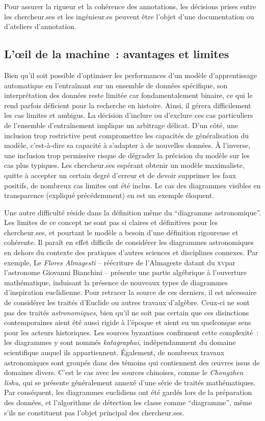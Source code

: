 Pour assurer la rigueur et la cohérence des annotations, les décisions
prises entre les chercheur.ses et les ingénieur.es peuvent être l'objet d'une
documentation ou d'ateliers d'annotation.

\hypertarget{loeil-de-la-machine-avantages-et-limites}{%
\subsection{L'œil de la machine~: avantages et
limites}\label{loeil-de-la-machine-avantages-et-limites}}

Bien qu'il soit possible d'optimiser les performances d'un modèle
d'apprentissage automatique en l'entraînant sur un ensemble de données
spécifique, son interprétation des données reste limitée car
fondamentalement binaire, ce qui le rend parfois déficient pour la
recherche en histoire. Ainsi, il gérera difficilement les cas limites et
ambigus. La décision d'inclure ou d'exclure ces cas particuliers de
l'ensemble d'entraînement implique un arbitrage délicat. D'un côté, une
inclusion trop restrictive peut compromettre les capacités de
généralisation du modèle, c'est-à-dire sa capacité à s'adapter à de
nouvelles données. À l'inverse, une inclusion trop permissive risque de
dégrader la précision du modèle sur les cas plus typiques. Les
chercheur.ses espérant obtenir un modèle maximaliste, quitte à accepter un
certain degré d'erreur et de devoir supprimer les faux
positifs, de nombreux cas limites ont été inclus. Le cas des diagrammes
visibles en transparence (expliqué précédemment) en est un exemple
éloquent.

Une autre difficulté réside dans la définition même du ``diagramme
astronomique''. Les limites de ce concept ne sont pas si claires et
définitives pour les chercheur.ses, et pourtant le modèle a besoin d'une
définition rigoureuse et cohérente. Il paraît en effet difficile de
considérer les diagrammes astronomiques en dehors du contexte des
pratiques d'autres sciences et disciplines connexes. Par exemple, Le
\emph{Flores Almagesti} -- réécriture de l'Almageste datant du \textsc{xv}\ieme par
l'astronome Giovanni Bianchini -- présente une partie algébrique à
l'ouverture mathématique, induisant la présence de nouveaux types de
diagrammes d'inspiration euclidienne. Pour retracer la source de ces
derniers, il est nécessaire de considérer les traités d'Euclide ou
autres travaux d'algèbre. Ceux-ci ne sont pas des traités
\emph{astronomiques}, bien qu'il ne soit pas certain que ces disinctions
contemporaines aient été aussi rigide à l'époque et aient eu un
quelconque sens pour les acteurs historiques. Les sources byzantines
confirment cette complexité~: les diagrammes y sont nommés
\emph{katagraphai}, indépendamment du domaine scientifique auquel ils
appartiennent. Également, de nombreux travaux astronomiques sont groupés
dans des témoins qui contiennent des œuvres issus de domaines divers.
C'est le cas avec les sources chinoises, comme le \emph{Chongzhen
lishu}, qui se présente généralement annexé d'une série de traités
mathématiques. Par conséquent, les diagrammes euclidiens ont été gardés
lors de la préparation des données, et l'algorithme de détection les
classe comme ``diagramme'', même s'ils ne constituent pas l'objet
principal des chercheur.ses.

